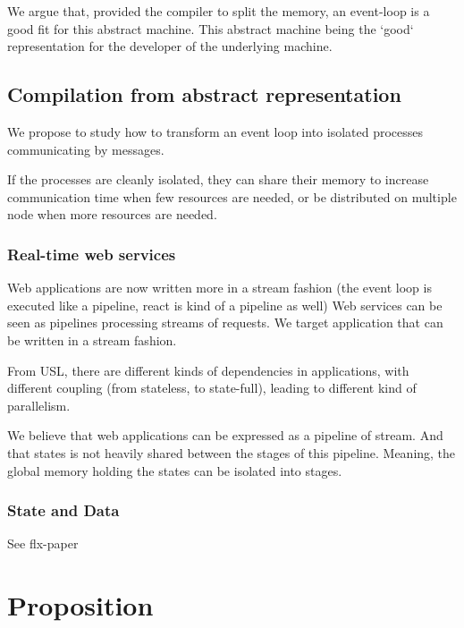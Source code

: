 We argue that, provided the compiler to split the memory, an event-loop is a good fit for this abstract machine.
This abstract machine being the `good` representation for the developer of the underlying machine.


\subsection{Compilation from abstract representation}

We propose to study how to transform an event loop into isolated processes communicating by messages.

If the processes are cleanly isolated, they can share their memory to increase communication time when few resources are needed, or be distributed on multiple node when more resources are needed.

\subsubsection{Real-time web services}

Web applications are now written more in a stream fashion (the event loop is executed like a pipeline, react is kind of a pipeline as well)
Web services can be seen as pipelines processing streams of requests.
We target application that can be written in a stream fashion.

From USL, there are different kinds of dependencies in applications, with different coupling (from stateless, to state-full), leading to different kind of parallelism.

We believe that web applications can be expressed as a pipeline of stream.
And that states is not heavily shared between the stages of this pipeline.
Meaning, the global memory holding the states can be isolated into stages.

\subsubsection{State and Data}

See flx-paper


\section{Proposition}




\endinput





